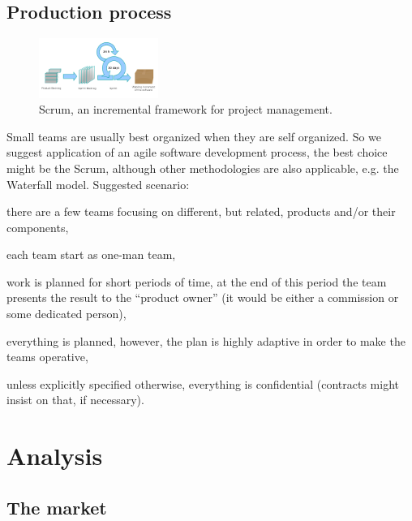 \documentclass[a4paper,twoside,15pt]{book}
\begin{document}
    \section{Production process}
        \enlargethispage{4\baselineskip}
        \begin{figure}
            \centering{}
            \includegraphics[width=110pt]{images/Scrum_process.png}
            \caption{Scrum, an incremental framework for project management.}
        \end{figure}
        Small teams are usually best organized when they are self organized. So we suggest application of an agile software development process, the best choice might be the Scrum, although other methodologies are also applicable, e.g. the Waterfall model.
        Suggested scenario:
        \begin{dinglist}{73}
            \item there are a few teams focusing on different, but related, products and/or their components,
            \item each team start as one-man team,
            \item work is planned for short periods of time, at the end of this period the team presents the result to the ``product owner'' (it would be either a commission or some dedicated person),
            \item everything is planned, however, the plan is highly adaptive in order to make the teams operative,
            \item unless explicitly specified otherwise, everything is confidential (contracts might insist on that, if necessary).
        \end{dinglist}

\chapter{Analysis}
    \section{The market}
\end{document}
